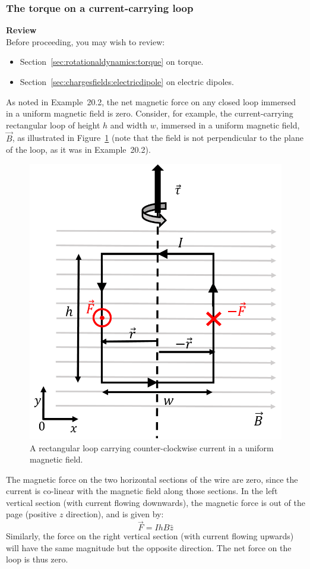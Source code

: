\subsubsection{The torque on a current-carrying loop}

\begin{framed}
\textbf{Review}\\
Before proceeding, you may wish to review:

\begin{itemize}
\item Section~\ref{sec:rotationaldynamics:torque} on torque.
\item Section~\ref{sec:chargesfields:electricdipole} on electric dipoles.
\end{itemize}
\end{framed}

As noted in Example~20.2, the net magnetic force on any closed loop immersed in a uniform magnetic field is zero. Consider, for example, the current-carrying rectangular loop of height $h$ and width $w$, immersed in a uniform magnetic field, $\vec B$, as illustrated in Figure~\ref{fig:magneticforce:rectangleloop} (note that the field is not perpendicular to the plane of the loop, as it was in Example~20.2).

\begin{figure}[!htbp]
\centering
\includegraphics[width=0.4\linewidth]{files/rectangleloop-8b237152477798e6ba19d2377c451e8d.png}
\caption[]{A rectangular loop carrying counter-clockwise current in a uniform magnetic field.}
\label{fig:magneticforce:rectangleloop}
\end{figure}

The magnetic force on the two horizontal sections of the wire are zero, since the current is co-linear with the magnetic field along those sections. In the left vertical section (with current flowing downwards), the magnetic force is out of the page (positive $z$ direction), and is given by:
\begin{equation}
\vec F = IhB\hat z
\end{equation}
Similarly, the force on the right vertical section (with current flowing upwards) will have the same magnitude but the opposite direction. The net force on the loop is thus zero.

